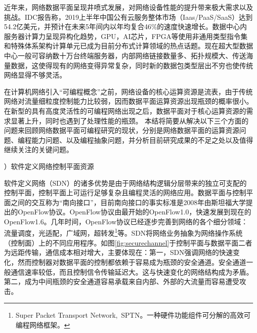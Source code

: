 \label{chap12}

近年来，网络数据平面呈现井喷式发展，对网络设备性能的提升带来极大需求以及挑战。IDC报告称，2019上半年中国公有云服务整体市场（Iaas/PaaS/SaaS）达到54.2亿美元，并预计在未来5年间内以年均复合46\%的速度快速增长。数据中心内服务器计算力呈现异构化趋势，GPU，AI芯片，FPGA等使用非通用类型指令集和特殊体系架构计算单元已成为目前分布式计算领域的热点话题。现在超大型数据中心一般可容纳数十万台终端服务器，内部网络链接数量多、拓扑规模大、传送海量数据，这使得现有的网络变得异常复杂，同时新的数据包类型层出不穷也使传统网络显得不够灵活。

在计算机网络引入“可编程概念”之前，网络设备的核心运算资源是流表，由于传统网络对流量细粒度控制能力比较弱，因而数据平面运算资源出现瓶颈的概率很小。在新型的具有高度灵活性的可编程网络出现之后，数据平面对于核心运算资源的需求显著上升，同时也遇到了处理性能的瓶颈。
本结将简要从解决以下三个方面的问题来回顾网络数据平面可编程研究的现状，分别是网络数据平面的运算资源问题、编程能力问题、以及编程抽象问题，并分析目前研究成果的不足之处以及值得继续关注的关键问题。




\label{chap121}

{）软件定义网络控制平面资源}




软件定义网络（SDN）的诸多优势是由于网络结构逻辑分层带来的独立可支配的控制平面，控制平面上可运行足够复杂且编程灵活的网络应用。数据平面与控制平面之间的交互称为“南向接口”，目前南向接口的事实标准是2008年由斯坦福大学提出的OpenFlow协议。OpenFlow协议由最开始的OpenFlow1.0，快速发展到现在的OpenFlow1.6。几年时间，OpenFlow协议已经逐步完善到网络的各个细分领域：流量调度，光适配，广域网，超转发\footnote{Super Packet Transport Network,~SPTN。一种硬件功能组件可分解的高效可编程网络框架。}等。SDN将网络业务抽象为网络操作系统（控制面）上的不同应用程序。如图\ref{fig:securechannel}于控制平面与数据平面二者为远距传输，通信成本相对增大，主要体现在：第一，SDN强调网络的快速变化，然而控制器对数据平面的控制都依赖于容易成为瓶颈的安全通道。安全通道一般通信速率较低，而且控制信令传输延迟大。这与快速变化的网络结构成为矛盾。第二，成为中间瓶颈的安全通道容易承载来自内部、外部的大流量而容易遭受攻击。

